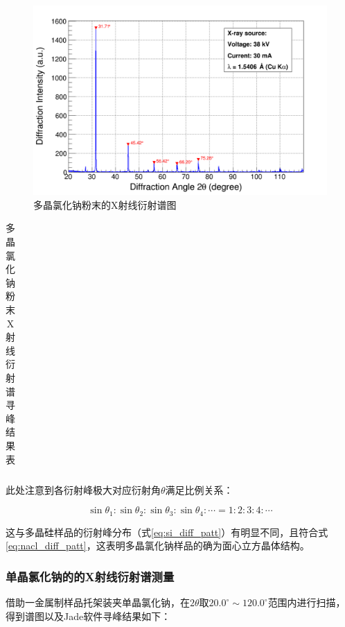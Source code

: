 \documentclass{thuemp}
\begin{document}
\begin{figure}[H]
    \centering
    \includegraphics[options]{../Data/NaCl-multi.png}
    \caption{多晶氯化钠粉末的X射线衍射谱图}
    \label{fig:nacl_xrd_multi}
\end{figure}

\begin{table}[H]
    \centering
    \captionnamefont{\wuhao\bf\heiti}
    \captiontitlefont{\wuhao\bf\heiti}
    \caption{多晶氯化钠粉末X射线衍射谱寻峰结果表}
    \label{tab:nacl_xrd_multi}
    \liuhao
    \begin{tabular}{ccccc}
        \toprule
        \midrule
        \bottomrule
    \end{tabular}
\end{table}

此处注意到各衍射峰极大对应衍射角$\theta$满足比例关系：

\begin{equation}
    \sin{\theta_1} : \sin{\theta_2} :\sin{\theta_3} : \sin{\theta_4} : \cdots = 1 : 2 : 3 : 4 : \cdots
    \label{eq:nacl_diff_patt}
\end{equation}

这与多晶硅样品的衍射峰分布（式\ref{eq:si_diff_patt}）有明显不同，且符合式\ref{eq:nacl_diff_patt}，这表明多晶氯化钠样品的确为面心立方晶体结构。

\subsubsection{单晶氯化钠的的X射线衍射谱测量}

借助一金属制样品托架装夹单晶氯化钠，在$2\theta$取$20.0^\circ \sim 120.0^\circ$范围内进行扫描，得到谱图以及Jade软件寻峰结果如下：
\end{document}
